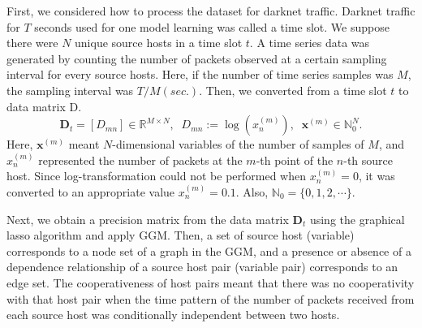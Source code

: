 \documentclass[conference]{IEEEtran}
\begin{document}
First, we considered how to process the dataset for darknet traffic.
Darknet traffic for $T$ seconds used for one model learning was called a time slot.
We suppose there were $N$ unique source hosts in a time slot $t$.
A time series data was generated by counting the number of packets observed at a certain sampling interval for every source hosts.
Here, if the number of time series samples was $M$, the sampling interval was $T/M (sec.)$.
Then, we converted from a time slot $t$ to data matrix D.
\begin{equation*}
\bm{D}_t=[D_{mn}]\in\mathbb{R}^{M \times N},
\;\;D_{mn} := \log(x_n^{(m)}),
\;\;\bm{x}^{(m)}\in\mathbb{N}_0^{N}.
\end{equation*}
Here, $\bm{x}^{(m)}$ meant $N$-dimensional variables of the number of samples of $M$, and $x_n^{(m)}$ represented the number of packets at the $m$-th point of the $n$-th source host.
Since log-transformation could not be performed when $x_n^{(m)}=0$, it was converted to an appropriate value $x_n^{(m)}=0.1$.
Also, $\mathbb{N}_0=\{0,1,2,\cdots\}$.

Next, we obtain a precision matrix from the data matrix $\bm{D}_t$ using the graphical lasso algorithm and apply GGM.
Then, a set of source host (variable) corresponds to a node set of a graph in the GGM, and a presence or absence of a dependence relationship of a source host pair (variable pair) corresponds to an edge set.
The cooperativeness of host pairs meant that there was no cooperativity with that host pair when the time pattern of the number of packets received from each source host was conditionally independent between two hosts.
\end{document}
